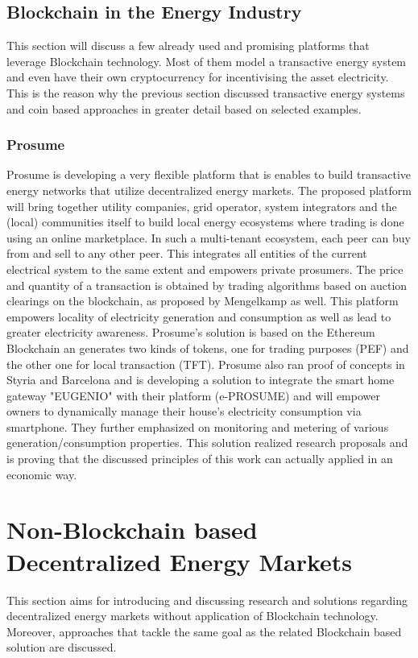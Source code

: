 \documentclass[runningheads]{llncs}
\begin{document}
\subsection{Blockchain in the Energy Industry}
This section will discuss a few already used and promising platforms that leverage Blockchain technology. Most of them model a transactive energy system and even have their own cryptocurrency for incentivising the asset electricity. This is the reason why the previous section discussed transactive energy systems and coin based approaches in greater detail based on selected examples.

\subsubsection{Prosume}
Prosume is developing a very flexible platform that is enables to build transactive energy networks that utilize decentralized energy markets. The proposed platform will bring together utility companies, grid operator, system integrators and the (local) communities itself to build local energy ecosystems where trading is done using an online marketplace. In such a multi-tenant ecosystem, each peer can buy from and sell to any other peer. This integrates all entities of the current electrical system to the same extent and empowers private prosumers. The price and quantity of a transaction is obtained by trading algorithms based on auction clearings on the blockchain, as proposed by Mengelkamp \cite{mengelkamp_lem} as well. \newline
This platform empowers locality of electricity generation and consumption as well as lead to greater electricity awareness. Prosume's solution is based on the Ethereum Blockchain an generates two kinds of tokens, one for trading purposes (PEF) and the other one for local transaction (TFT). \cite{prosume_wp}
Prosume also ran proof of concepts in Styria and Barcelona and is developing a solution to integrate the smart home gateway "EUGENIO" with their platform (e-PROSUME) and will empower owners to dynamically manage their house's electricity consumption via smartphone. They further emphasized on monitoring and metering of various generation/consumption properties. \cite{prosume_briefing}
This solution realized research proposals and is proving that the discussed principles of this work can actually applied in an economic way.

\section{Non-Blockchain based Decentralized Energy Markets}
This section aims for introducing and discussing research and solutions regarding decentralized energy markets without application of Blockchain technology. Moreover, approaches that tackle the same goal as the related Blockchain based solution are discussed.
\end{document}
